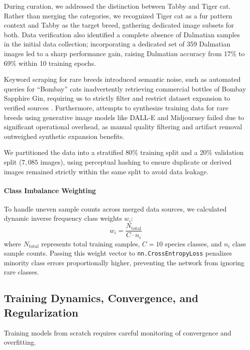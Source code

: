 During curation, we addressed the distinction between Tabby and Tiger cat. Rather than merging the categories, we recognized Tiger cat as a fur pattern context and Tabby as the target breed, gathering dedicated image subsets for both. Data verification also identified a complete absence of Dalmatian samples in the initial data collection; incorporating a dedicated set of 359 Dalmatian images led to a sharp performance gain, raising Dalmatian accuracy from 17\% to 69\% within 10 training epochs.

Keyword scraping for rare breeds introduced semantic noise, such as automated queries for ``Bombay'' cats inadvertently retrieving commercial bottles of Bombay Sapphire Gin, requiring us to strictly filter and restrict dataset expansion to verified sources \cite{unsplash, pixabay}. Furthermore, attempts to synthesize training data for rare breeds using generative image models like DALL-E and Midjourney failed due to significant operational overhead, as manual quality filtering and artifact removal outweighed synthetic expansion benefits.

We partitioned the data into a stratified 80\% training split and a 20\% validation split ($7,085$ images), using perceptual hashing to ensure duplicate or derived images remained strictly within the same split to avoid data leakage.

\paragraph{Class Imbalance Weighting}
To handle uneven sample counts across merged data sources, we calculated dynamic inverse frequency class weights $w_i$:
\begin{equation}
    w_i = \frac{N_{\text{total}}}{C \cdot n_i}
\end{equation}
where $N_{\text{total}}$ represents total training samples, $C=10$ species classes, and $n_i$ class sample counts. Passing this weight vector to \texttt{nn.CrossEntropyLoss} penalizes minority class errors proportionally higher, preventing the network from ignoring rare classes.

\subsection{Training Dynamics, Convergence, and Regularization}
\label{subsec:training_dynamics}

Training models from scratch requires careful monitoring of convergence and overfitting.

